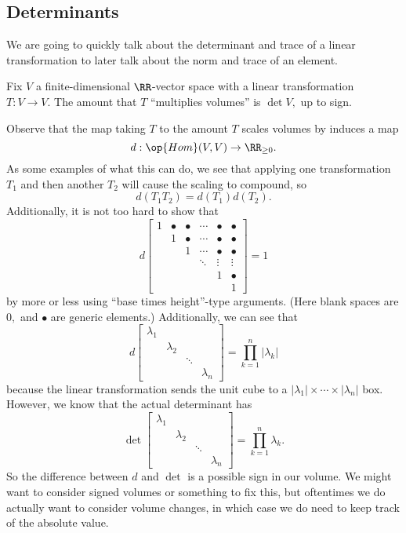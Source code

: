 \subsection{Determinants}
We are going to quickly talk about the determinant and trace of a linear transformation to later talk about the norm and trace of an element.
\begin{definition}
	Fix $V$ a finite-dimensional $\RR$-vector space with a linear transformation $T:V\to V.$ The amount that $T$ ``multiplies volumes'' is $\det V,$ up to sign.
\end{definition}
Observe that the map taking $T$ to the amount $T$ scales volumes by induces a map
\[d:\op{Hom}(V,V)\to\RR_{\ge0}.\]
As some examples of what this can do, we see that applying one transformation $T_1$ and then another $T_2$ will cause the scaling to compound, so
\[d(T_1T_2)=d(T_1)d(T_2).\]
Additionally, it is not too hard to show that
\[d\begin{bmatrix}
	1 & \bullet & \bullet & \cdots & \bullet & \bullet \\
	& 1 & \bullet & \cdots & \bullet & \bullet\\
	& & 1 & \cdots & \bullet & \bullet\\
	& &   & \ddots & \vdots & \vdots \\
	&   &        &        & 1      & \bullet \\
	&   &        &        &        & 1
\end{bmatrix}=1 \tag{1}\label{eq:det1}\]
by more or less using ``base times height''-type arguments. (Here blank spaces are $0,$ and $\bullet$ are generic elements.) Additionally, we can see that
\[d\begin{bmatrix}
	\lambda_1 \\
	& \lambda_2 \\
	& & \ddots \\
	& & & \lambda_n
\end{bmatrix}=\prod_{k=1}^n|\lambda_k|\]
because the linear transformation sends the unit cube to a $|\lambda_1|\times\cdots\times|\lambda_n|$ box. However, we know that the actual determinant has
\[\det\begin{bmatrix}
	\lambda_1 \\
	& \lambda_2 \\
	& & \ddots \\
	& & & \lambda_n
\end{bmatrix}=\prod_{k=1}^n\lambda_k. \tag{2}\label{eq:det2}\]
So the difference between $d$ and $\det$ is a possible sign in our volume. We might want to consider signed volumes or something to fix this, but oftentimes we do actually want to consider volume changes, in which case we do need to keep track of the absolute value.
